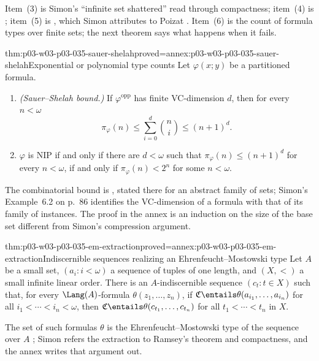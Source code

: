 Item~(3) is Simon's ``infinite set shattered'' read through compactness;
item~(4) is \cite[Lemma~2.5, p.~14]{Simon2015GuideManuscript}; item~(5) is
\cite[Lemma~2.7, p.~15]{Simon2015GuideManuscript}, which Simon attributes to
Poizat \cite[p.~36]{Simon2015GuideManuscript}.  Item~(6) is the count of
formula types over finite sets; the next theorem says what happens when it
fails.

\begin{hbtheorem}{thm:p03-w03-p03-035-sauer-shelah}{proved=annex:p03-w03-p03-035-sauer-shelah}{Exponential or polynomial type counts}
Let \(\varphi(x;y)\) be a partitioned formula.
\begin{enumerate}
  \item \emph{(Sauer--Shelah bound.)}  If \(\varphi^{\mathrm{opp}}\) has
        finite VC-dimension \(d\), then for every \(n<\omega\)
        \[
          \pi_\varphi(n)\leq\sum_{i=0}^{d}\binom ni\leq(n+1)^d .
        \]
  \item \(\varphi\) is NIP if and only if there are \(d<\omega\) such that
        \(\pi_\varphi(n)\leq(n+1)^d\) for every \(n<\omega\), if and only if
        \(\pi_\varphi(n)<2^n\) for some \(n<\omega\).
\end{enumerate}
\end{hbtheorem}

The combinatorial bound is \cite[Lemma~6.4, p.~86]{Simon2015GuideManuscript},
stated there for an abstract family of sets; Simon's Example~6.2 on p.~86
identifies the VC-dimension of a formula with that of its family of
instances.  The proof in the annex is an induction on the size of the base
set different from Simon's compression argument.

\begin{hblemma}{thm:p03-w03-p03-035-em-extraction}{proved=annex:p03-w03-p03-035-em-extraction}{Indiscernible sequences realizing an Ehrenfeucht--Mostowski type}
Let \(A\) be a small set, \((a_i:i<\omega)\) a sequence of tuples of one
length, and \((X,<)\) a small infinite linear order.  There is an
\(A\)-indiscernible sequence \((c_t:t\in X)\) such that, for every
\(\Lang(A)\)-formula \(\theta(z_1,\ldots,z_n)\), if
\(\mathfrak C\entails\theta(a_{i_1},\ldots,a_{i_n})\) for all
\(i_1<\cdots<i_n<\omega\), then
\(\mathfrak C\entails\theta(c_{t_1},\ldots,c_{t_n})\) for all
\(t_1<\cdots<t_n\) in \(X\).
\end{hblemma}

The set of such formulas \(\theta\) is the Ehrenfeucht--Mostowski type of the
sequence over \(A\) \cite[Section~1.1.1, p.~11]{Simon2015GuideManuscript};
Simon refers the extraction to Ramsey's theorem and compactness, and the
annex writes that argument out.

